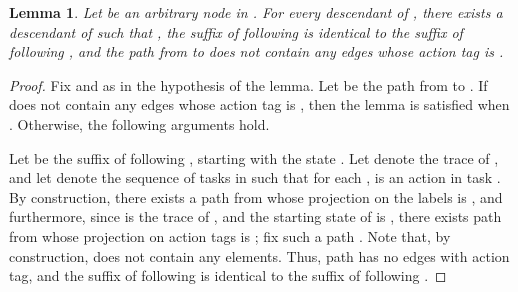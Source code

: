 \documentclass[11pt]{article}
\numberwithin{theorem}{section}
\newtheorem{lemma}[theorem]{Lemma}
\begin{document}
\begin{lemma}\label{lem:everyDescendantNoBot}
 Let  be an arbitrary node in . For every descendant  of , there exists a descendant  of  such that  , the suffix of  following  is identical to the suffix of  following , and the path  from  to  does not contain any edges whose action tag is .
\end{lemma}
\begin{proof}
Fix  and  as in the hypothesis of the lemma. Let  be the path from  to . If  does not contain any edges whose action tag is , then the lemma is satisfied when . Otherwise, the following arguments hold.

Let  be the suffix of  following , starting with the state . Let  denote the trace of , and let  denote the sequence of tasks in  such that for each ,  is an action in task . By construction, there exists a path from  whose projection on the labels is , and furthermore, since  is the trace of , and the starting state of  is , there exists path  from  whose projection on action tags is ; fix such a path . Note that, by construction,  does not contain any  elements. Thus, path  has no edges with  action tag, and the suffix of  following  is identical to the suffix of  following .
\end{proof}
\end{document}
